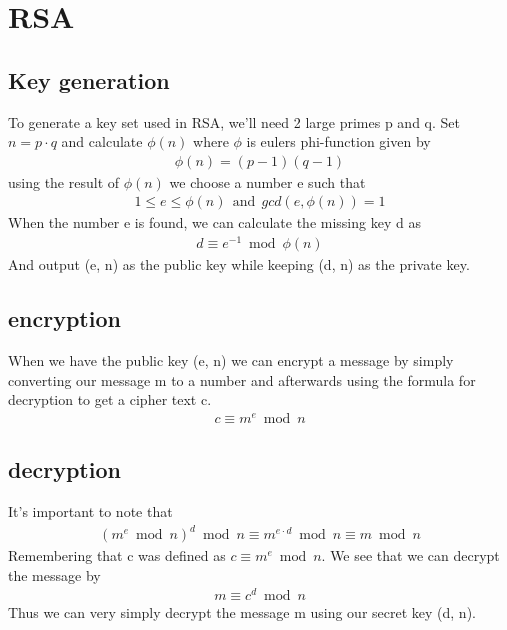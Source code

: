 \documentclass[../master.tex]{subfiles}
\begin{document}
    \section{RSA}\label{sec:rsa}
    \subsection{Key generation}\label{subsec:key-generation}
    To generate a key set used in RSA, we'll need 2 large primes p and q.
    Set $n = p \cdot q$ and calculate
    $\phi(n)$ where $\phi$ is eulers phi-function given by
    \begin{align*}
        \phi(n) = (p-1)(q-1)
    \end{align*}
    using the result of $\phi(n)$ we choose a number e such that
    \begin{align*}
        1 \leq e \leq \phi(n) \ \ \text{and} \ \ gcd(e, \phi(n)) = 1
    \end{align*}
    When the number e is found, we can calculate the missing key d as
    \begin{align*}
        d \equiv e^{-1} \bmod \phi(n)
    \end{align*}
    And output (e, n) as the public key while keeping (d, n) as the private key.


    \subsection{encryption}\label{subsec:encryption}
    When we have the public key (e, n) we can encrypt a message by simply converting our message m to a number and afterwards
    using the formula for decryption to get a cipher text c.
    \begin{align*}
        c \equiv m^e \bmod n
    \end{align*}


    \subsection{decryption}\label{subsec:decryption}
    It's important to note that
    \begin{align*}
        (m^e \bmod n)^d \bmod n
        \equiv
        m^{e \cdot d} \bmod n
        \equiv
        m \bmod n
    \end{align*}
    Remembering that c was defined as $c \equiv m^e \bmod n$.
    We see that we can decrypt the message by
    \begin{align*}
        m \equiv c^d \bmod n
    \end{align*}
    Thus we can very simply decrypt the message m using our secret key (d, n).
\end{document}
